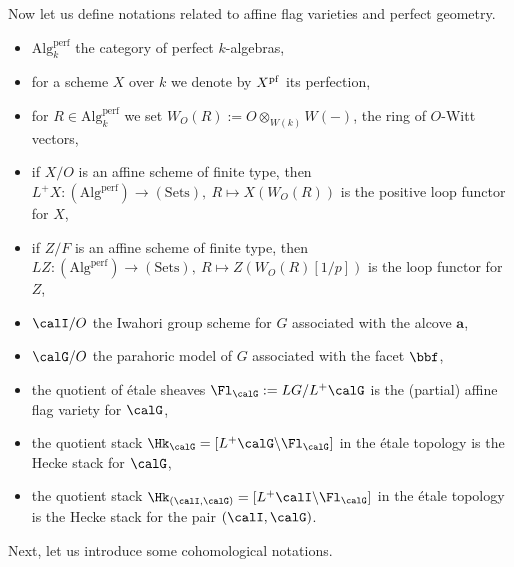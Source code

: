 \documentclass[10pt, reqno]{amsart}
\theoremstyle{plain}
\theoremstyle{definition}
\numberwithin{equation}{section}
\begin{document}
	Now let us define notations related to affine flag varieties and perfect geometry.
	
	\begin{itemize}
		\item $\mathrm{Alg}^{\mathrm{perf}}_k$ the category of perfect $k$-algebras,
		\item for a scheme $X$ over $k$ we denote by $X^{\rm{pf}}$ its perfection, 
		\item for $R\in \mathrm{Alg}^{\mathrm{perf}}_k$ we set $W_O(R):=O\otimes_{W(k)}W(-)$, the ring of $O$-Witt vectors,
		\item if $X/O$ is an affine scheme of finite type, then $L^+X\colon (\mathrm{Alg}^{\mathrm{perf}})\to (\mathrm{Sets}),\ R\mapsto X(W_O(R))$ is the positive loop functor for $X$,
		\item if $Z/F$ is an affine scheme of finite type, then $LZ\colon (\mathrm{Alg}^{\mathrm{perf}})\to (\mathrm{Sets}),\ R\mapsto Z(W_O(R)[1/p])$ is the loop functor for $Z$,
		\item $\calI/O$ the Iwahori group scheme for $G$ associated with the alcove $\mathbf{a}$,
		\item $\calG/O$ the parahoric model of $G$ associated with the facet $\bbf$,
		\item the quotient of \'etale sheaves $\Fl_\calG:=LG/L^+\calG$ is the (partial) affine flag variety for $\calG$,
		\item the quotient stack $\Hk_{\calG}=[L^+\calG\backslash \Fl_{ \calG}]$ in the étale topology is the Hecke stack for $\calG$,
		\item the quotient stack $\Hk_{(\calI,\calG)}=[L^+\calI\backslash \Fl_{ \calG}]$ in the étale topology is the Hecke stack for the pair $(\calI,\calG)$.		
	\end{itemize}
	Next, let us introduce some cohomological notations.
	
\end{document}
